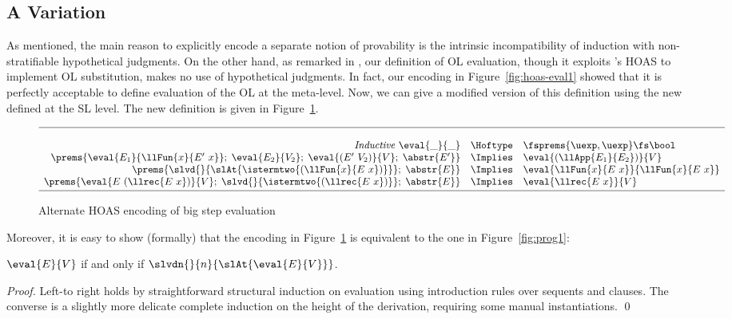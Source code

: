 \documentclass[final]{svjour3}
\begin{document}
\subsection{A Variation}
\label{ssec:variation}
As mentioned, the main reason to explicitly encode a separate notion
of provability is the intrinsic incompatibility of induction with
non-stratifiable hypothetical judgments. On the other hand, as
remarked in \cite{Momigliano03fos}, our definition of OL evaluation,
though it exploits \hybrid's HOAS to implement OL substitution, makes
no use of hypothetical judgments.  In fact, our encoding in
Figure~\ref{fig:hoas-eval1} showed that it is perfectly acceptable to
define evaluation of the OL at the meta-level.
Now, we can give a modified version of this definition using the new
 defined at the SL level.  The new definition is given in
Figure~\ref{fig:hoas-eval2}.
\begin{figure}[t]
  \begin{center}
    \[
\begin{array}{rcl}
\hline\\
 \mathit{Inductive}\ \eval{ \_} { \_} &\Hoftype & \fsprems{\uexp, \uexp} \fs \bool  \\
 \prems{\eval{E_1}{\llFun{x}{E'\ x}};\; \eval{E_2}{V_2};\;
          \eval{(E'\ V_2)}{V};\;          \abstr{E'}}
 & \Implies &  \eval{(\llApp{E_1} {E_2})}{V}  \\
   \prems{\slvd{}{\slAt{\istermtwo{(\llFun{x}{E\ x})}}};\; \abstr{E}}  & \Implies &
   \eval{\llFun{x}{E\ x}}{\llFun{x}{E\ x}}\\ 
   \prems{\eval{E\ (\llrec{E\ x})}{V};\; \slvd{}{\istermtwo{(\llrec{E\ x})}};\; \abstr{E}}
   & \Implies & \eval{\llrec{E\ x}}{V}
 \\[.5ex]\hline
\end{array}
\]
    \caption{Alternate HOAS encoding of big step evaluation}
    \label{fig:hoas-eval2}
  \end{center}
\end{figure}
Moreover, it is easy to show (formally) that the encoding in
Figure~\ref{fig:hoas-eval2} is equivalent to the one in
Figure~\ref{fig:prog1}:
\begin{goal}
  $\eval{E}{V}$ if and only if $\slvdn{}{n}{\slAt{\eval{E}{V}}}$.
\end{goal}
\begin{proof}
  Left-to right holds by straightforward structural induction on
  evaluation using introduction rules over sequents and 
  clauses. The converse is a slightly more delicate complete induction
  on the height of the derivation, requiring some manual  instantiations.
\qed\end{proof}
\end{document}
